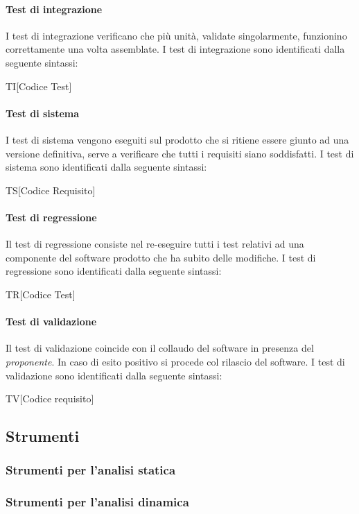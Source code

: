 \paragraph{Test di integrazione}
I test di integrazione verificano che più unità, validate singolarmente, funzionino 
correttamente una volta assemblate. I test di integrazione sono identificati 
dalla seguente sintassi:
\begin{center}
  TI[Codice Test]
\end{center}
\paragraph{Test di sistema}
I test di sistema vengono eseguiti sul prodotto che si ritiene essere giunto ad 
una versione definitiva, serve a verificare che tutti i requisiti siano 
soddisfatti. I test di sistema sono identificati dalla seguente sintassi:
\begin{center}
  TS[Codice Requisito]
\end{center}
\paragraph{Test di regressione}
Il test di regressione consiste nel re-eseguire tutti i test relativi ad una 
componente del software prodotto che ha subito delle modifiche. I test di 
regressione sono identificati dalla seguente sintassi:
\begin{center}
  TR[Codice Test]
\end{center}
\paragraph{Test di validazione}
Il test di validazione coincide con il collaudo del software in presenza del 
\textit{proponente}. In caso di esito positivo si procede col rilascio del 
software. I test di validazione sono identificati dalla seguente sintassi:
\begin{center}
  TV[Codice requisito]
\end{center}

\subsection{Strumenti}

\subsubsection{Strumenti per l'analisi statica}

\subsubsection{Strumenti per l'analisi dinamica}



